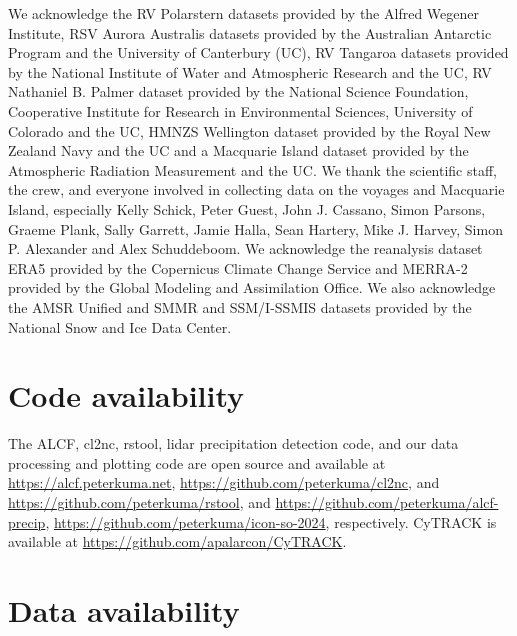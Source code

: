 \documentclass[12pt,a4paper]{article}
\begin{document}
We acknowledge the RV Polarstern datasets provided by the Alfred Wegener
Institute, RSV Aurora Australis datasets provided by the Australian Antarctic
Program and the University of Canterbury (UC), RV Tangaroa datasets provided by
the National Institute of Water and Atmospheric Research and the UC, RV
Nathaniel B. Palmer dataset provided by the National Science Foundation,
Cooperative Institute for Research in Environmental Sciences, University of
Colorado and the UC, HMNZS Wellington dataset provided by the Royal New Zealand
Navy and the UC and a Macquarie Island dataset provided by the Atmospheric
Radiation Measurement and the UC. We thank the scientific staff, the crew, and
everyone involved in collecting data on the voyages and Macquarie Island,
especially Kelly Schick, Peter Guest, John J. Cassano, Simon Parsons, Graeme
Plank, Sally Garrett, Jamie Halla, Sean Hartery, Mike J.  Harvey, Simon P.
Alexander and Alex Schuddeboom. We acknowledge the reanalysis dataset ERA5
provided by the Copernicus Climate Change Service and MERRA-2 provided by the
Global Modeling and Assimilation Office. We also acknowledge the AMSR Unified
and SMMR and SSM/I-SSMIS datasets provided by the National Snow and Ice Data
Center.

\section*{Code availability}

The ALCF, cl2nc, rstool, lidar precipitation detection code, and our data
processing and plotting code are open source and available at
\url{https://alcf.peterkuma.net}, \url{https://github.com/peterkuma/cl2nc}, and
\url{https://github.com/peterkuma/rstool}, and
\url{https://github.com/peterkuma/alcf-precip},
\url{https://github.com/peterkuma/icon-so-2024}, respectively. CyTRACK is
available at \url{https://github.com/apalarcon/CyTRACK}.

\section*{Data availability}
\end{document}
